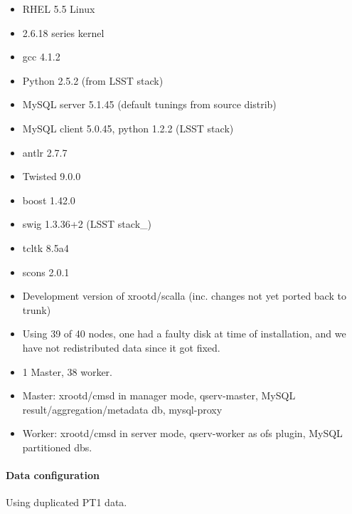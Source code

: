 \documentclass[DM,toc]{lsstdoc}
\begin{document}
\begin{itemize}
\item
  RHEL 5.5 Linux
\item
  2.6.18 series kernel
\item
  gcc 4.1.2
\item
  Python 2.5.2 (from LSST stack)
\item
  MySQL server 5.1.45 (default tunings from source distrib)
\item
  MySQL client 5.0.45, python 1.2.2 (LSST stack)
\item
  antlr 2.7.7
\item
  Twisted 9.0.0
\item
  boost 1.42.0
\item
  swig 1.3.36+2 (LSST stack\_)
\item
  tcltk 8.5a4
\item
  scons 2.0.1
\item
  Development version of xrootd/scalla (inc. changes not yet ported back
  to trunk)
\end{itemize}

\begin{itemize}
\item
  Using 39 of 40 nodes, one had a faulty disk at time of installation,
  and we have not redistributed data since it got fixed.
\item
  1 Master, 38 worker.
\item
  Master: xrootd/cmsd in manager mode, qserv-master, MySQL
  result/aggregation/metadata db, mysql-proxy
\item
  Worker: xrootd/cmsd in server mode, qserv-worker as ofs plugin, MySQL
  partitioned dbs.
\end{itemize}

\paragraph{Data configuration}\label{data-configuration}

Using duplicated PT1 data.
\end{document}
